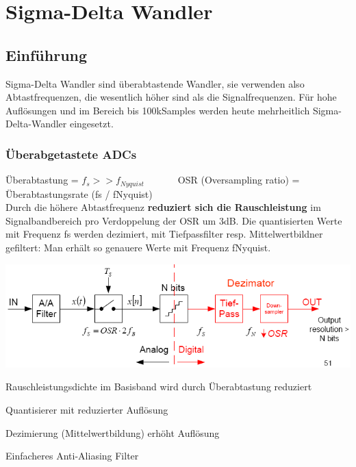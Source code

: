 \section{Sigma-Delta Wandler}

\subsection{Einführung}
Sigma-Delta Wandler sind überabtastende Wandler, sie verwenden also Abtastfrequenzen, die wesentlich höher sind als die Signalfrequenzen. Für hohe Auflösungen und im Bereich bis 100kSamples werden heute mehrheitlich Sigma-Delta-Wandler eingesetzt.
\subsubsection{Überabgetastete ADCs}
Überabtastung = $f_{s} >> f_{Nyquist}$\ \ \ \ \ \ \ OSR (Oversampling ratio) = Überabtastungsrate (fs / fNyquist)\\
Durch die höhere Abtastfrequenz \textbf{reduziert sich die Rauschleistung} im Signalbandbereich pro Verdoppelung der OSR um 3dB. Die quantisierten Werte mit Frequenz fs werden dezimiert, mit Tiefpassfilter resp. Mittelwertbildner gefiltert: Man erhält so genauere Werte mit Frequenz fNyquist.
\begin{minipage}{0.40\textwidth}
    \includegraphics[width=1.0\textwidth]{images/Prinzipschema}
\end{minipage}
\hfill
\begin{minipage}{0.55\textwidth}
    \begin{compactitem}
        \item Rauschleistungsdichte im Basisband wird durch Überabtastung reduziert
        \item Quantisierer mit reduzierter Auflösung
        \item Dezimierung (Mittelwertbildung) erhöht Auflösung
        \item Einfacheres Anti-Aliasing Filter
    \end{compactitem}
\end{minipage}
